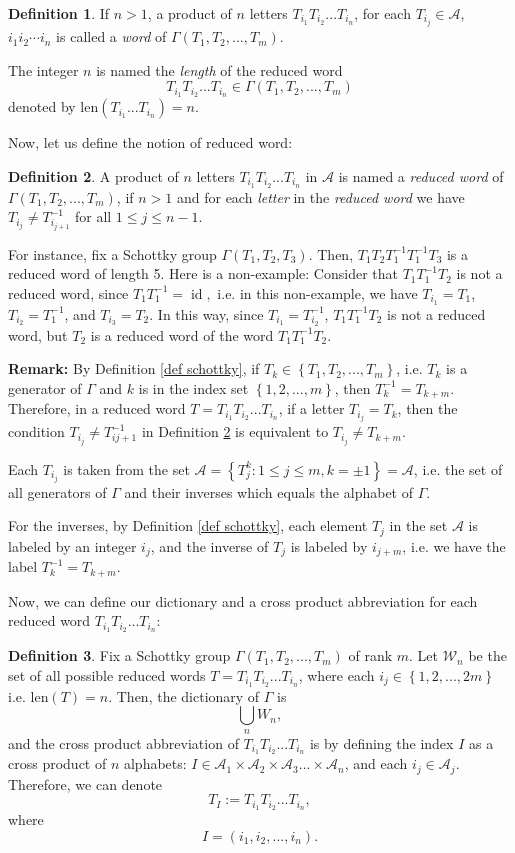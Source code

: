 \documentclass[12pt,oneside]{sfsuthesis}
\theoremstyle{plain} %
\theoremstyle{definition}  %
\newtheorem{definition}{Definition}[chapter]
\theoremstyle{remark}  %
\theoremstyle{plain}
\DeclareMathOperator{\id}{id}
\begin{document}
{\begin{definition}
If $n>1$, a product of $n$ letters $T_{i_1}T_{i_2}...T_{i_n}$, for each $T_{i_j}\in \mathcal{A}$, $i_1i_2\cdots i_n$ is called a \textit{word} of $\Gamma(T_1,T_2,...,T_m)$. 

The integer $n$ is named the \textit{length} of the reduced word $$T_{i_1}T_{i_2}...T_{i_n}\in \Gamma(T_1,T_2,...,T_m)$$ denoted by $\text{len}(T_{i_1}...T_{i_n})= n$. 
\end{definition}

Now, let us define the notion of reduced word:
\begin{definition}\label{reduced word}
A product of $n$ letters $T_{i_1}T_{i_2}...T_{i_n}$ in $\mathcal{A}$ is named a \textit{reduced word} of $\Gamma(T_1,T_2,...,T_m)$, if $n>1$ and for each \textit{letter} in the \textit{reduced word} we have $T_{i_j}\neq T_{i_{j+1}}^{-1}$ for all $1\leq j \leq n-1$. 
\end{definition}

For instance, fix a Schottky group $\Gamma(T_1,T_2,T_3)$. Then, $T_1T_2T_1^{-1}T_1^{-1}T_3$ is a reduced word of length 5. Here is a non-example: Consider that $T_1T_1^{-1}T_2$ is not a reduced word, since $T_1T_1^{-1}=\id,$ i.e. in this non-example, we have $T_{i_1}=T_1$, $T_{i_2}=T_1^{-1}$, and $T_{i_3}=T_2$. In this way, since $T_{i_1}= T_{i_2}^{-1}$, $T_1T_1^{-1}T_2$ is not a reduced word, but $T_2$ is a reduced word of the word $T_1T_1^{-1}T_2$.

\textbf{Remark:} By Definition \ref{def schottky}, if $T_k \in \left\lbrace T_1,T_2,...,T_m\right\rbrace$, i.e. $T_k$ is a generator of $\Gamma$ and $k$ is in the index set $\left\lbrace 1,2,...,m\right\rbrace$, then $T_k^{-1}=T_{k+m}$. Therefore, in a reduced word $T=T_{i_1}T_{i_2}...T_{i_n}$, if a letter $T_{i_j}=T_k$, then the condition $T_{i_j}\neq T_{i{j+1}}^{-1}$ in Definition \ref{reduced word} is equivalent to $T_{i_j}\neq T_{k+m}$.

Each $T_{i_j}$ is taken from the set $\mathcal{A}=\left\lbrace T_j^k:1\leq j\leq m, k=\pm 1 \right\rbrace=\mathcal{A}$, i.e. the set of all generators of $\Gamma$ and their inverses which equals the alphabet of $\Gamma$. 

For the inverses, by Definition \ref{def schottky}, each element $T_j$ in the set $\mathcal{A}$ is labeled by an integer $i_j$, and the inverse of $T_j$ is labeled by $i_{j+m}$, i.e. we have the label $T_k^{-1}=T_{k+m}$. 

Now, we can define our dictionary and a cross product abbreviation for each reduced word $T_{i_1}T_{i_2}...T_{i_n}$:
\begin{definition}
Fix a Schottky group $\Gamma(T_1,T_2,...,T_m)$ of rank $m$. Let ${\mathcal W}_n$ be the set of all possible reduced words $T=T_{i_1}T_{i_2}...T_{i_n}$, where each $i_j\in\left\lbrace 1,2,...,2m\right\rbrace$ i.e. $\text{len}(T)=n$. Then, the dictionary of $\Gamma$ is 
$$
\bigcup\limits_{n}W_n,
$$
and the cross product abbreviation of $T_{i_1}T_{i_2}...T_{i_n}$ is by defining the index $I$ as a cross product of $n$ alphabets: $I\in \mathcal{A}_1\times\mathcal{A}_2\times\mathcal{A}_3...\times\mathcal{A}_n$, and each $i_j\in \mathcal{A}_j$. Therefore, we can denote $$T_I:=T_{i_1}T_{i_2}...T_{i_n},$$
where
$$
I=(i_1,i_2,...,i_n).
$$ 


\end{definition}}
\end{document}
